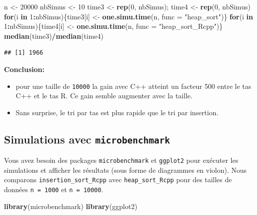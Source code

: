 \documentclass[
]{article}
\newenvironment{Shaded}{\begin{snugshade}}{\end{snugshade}}
\newcommand{\AttributeTok}[1]{\textcolor[rgb]{0.13,0.29,0.53}{#1}}
\newcommand{\ControlFlowTok}[1]{\textcolor[rgb]{0.13,0.29,0.53}{\textbf{#1}}}
\newcommand{\DecValTok}[1]{\textcolor[rgb]{0.00,0.00,0.81}{#1}}
\newcommand{\FunctionTok}[1]{\textcolor[rgb]{0.13,0.29,0.53}{\textbf{#1}}}
\newcommand{\NormalTok}[1]{#1}
\newcommand{\OtherTok}[1]{\textcolor[rgb]{0.56,0.35,0.01}{#1}}
\newcommand{\SpecialCharTok}[1]{\textcolor[rgb]{0.81,0.36,0.00}{\textbf{#1}}}
\newcommand{\StringTok}[1]{\textcolor[rgb]{0.31,0.60,0.02}{#1}}
\begin{document}
\begin{Shaded}
\begin{Highlighting}[]
\NormalTok{n }\OtherTok{\textless{}{-}} \DecValTok{20000}
\NormalTok{nbSimus }\OtherTok{\textless{}{-}} \DecValTok{10}
\NormalTok{time3 }\OtherTok{\textless{}{-}} \FunctionTok{rep}\NormalTok{(}\DecValTok{0}\NormalTok{, nbSimus); time4 }\OtherTok{\textless{}{-}} \FunctionTok{rep}\NormalTok{(}\DecValTok{0}\NormalTok{, nbSimus)}
\ControlFlowTok{for}\NormalTok{(i }\ControlFlowTok{in} \DecValTok{1}\SpecialCharTok{:}\NormalTok{nbSimus)\{time3[i] }\OtherTok{\textless{}{-}} \FunctionTok{one.simu.time}\NormalTok{(n, }\AttributeTok{func =} \StringTok{"heap\_sort"}\NormalTok{)\}}
\ControlFlowTok{for}\NormalTok{(i }\ControlFlowTok{in} \DecValTok{1}\SpecialCharTok{:}\NormalTok{nbSimus)\{time4[i] }\OtherTok{\textless{}{-}} \FunctionTok{one.simu.time}\NormalTok{(n, }\AttributeTok{func =} \StringTok{"heap\_sort\_Rcpp"}\NormalTok{)\}}
\FunctionTok{median}\NormalTok{(time3)}\SpecialCharTok{/}\FunctionTok{median}\NormalTok{(time4)}
\end{Highlighting}
\end{Shaded}

\begin{verbatim}
## [1] 1966
\end{verbatim}

\textbf{Conclusion:}

\begin{itemize}
\item
  pour une taille de \texttt{10000} la gain avec C++ atteint un facteur
  500 entre le tas C++ et le tas R. Ce gain semble augmenter avec la
  taille.
\item
  Sans surprise, le tri par tas est plus rapide que le tri par
  insertion.
\end{itemize}

\subsection{\texorpdfstring{Simulations avec
\texttt{microbenchmark}}{Simulations avec microbenchmark}}\label{simulations-avec-microbenchmark}

Vous avez besoin des packages \texttt{microbenchmark} et
\texttt{ggplot2} pour exécuter les simulations et afficher les résultats
(sous forme de diagrammes en violon). Nous comparons
\texttt{insertion\_sort\_Rcpp} avec \texttt{heap\_sort\_Rcpp} pour des
tailles de données \texttt{n\ =\ 1000} et \texttt{n\ =\ 10000}.

\begin{Shaded}
\begin{Highlighting}[]
\FunctionTok{library}\NormalTok{(microbenchmark)}
\FunctionTok{library}\NormalTok{(ggplot2)}
\end{Highlighting}
\end{Shaded}
\end{document}

